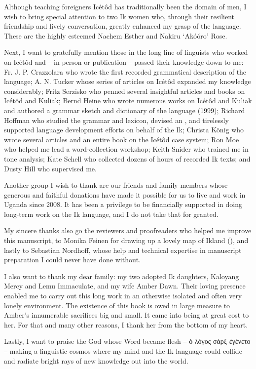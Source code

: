 Although teaching foreigners Icétôd has traditionally been the domain of men, I wish to bring special attention to two Ik women who, through their resilient friendship and lively conversation, greatly enhanced my grasp of the language. These are the highly esteemed Nachem Esther and Nakiru ‘Akóóro’ Rose.

Next, I want to gratefully mention those in the long line of linguists who worked on Icétôd and – in person or publication – passed their knowledge down to me: Fr. J. P. Crazzolara who wrote the first recorded grammatical description of the language; A. N. Tucker whose series of articles on Icétôd expanded my knowledge considerably; Fritz Serzisko who penned several insightful articles and books on Icétôd and Kuliak; Bernd Heine who wrote numerous works on Icétôd and Kuliak and authored a grammar sketch and dictionary of the language (1999); Richard Hoffman who studied the grammar and lexicon, devised an , and tirelessly supported language development efforts on behalf of the Ik; Christa K\"{o}nig who wrote several articles and an entire book on the Icétôd case system; Ron Moe who helped me lead a word-collection workshop; Keith Snider who trained me in tone analysis; Kate Schell who collected dozens of hours of recorded Ik texts; and Dusty Hill who supervised me.

Another group I wish to thank are our friends and family members whose generous and faithful donations have made it possible for us to live and work in Uganda since 2008. It has been a privilege to be financially supported in doing long-term work on the Ik language, and I do not take that for granted. 

My sincere thanks also go the reviewers and proofreaders who helped me improve this manuscript, to Monika Feinen for drawing up a lovely map of Ikland (), and lastly to Sebastian Nordhoff, whose  help and technical expertise in manuscript preparation I could never have done without.

I also want to thank my dear family: my two adopted Ik daughters, Kaloyang Mercy and Lemu Immaculate, and my wife Amber Dawn. Their loving presence enabled me to carry out this long work in an otherwise isolated and often very lonely environment. The existence of this book is owed in large measure to Amber’s innumerable sacrifices big and small. It came into being at great cost to her. For that and many other reasons, I thank her from the bottom of my heart.

Lastly, I want to praise the God whose Word became flesh
-- ὁ λόγος σὰρξ ἐγένετο --
making a linguistic cosmos where my mind and the Ik language could collide and radiate bright rays of new knowledge out into the world.
